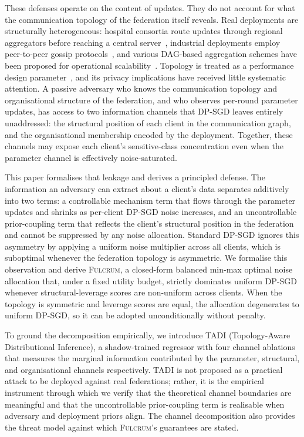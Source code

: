 \documentclass[letterpaper,journal]{IEEEtran}
\newcommand{\TADI}{\textsc{TADI}\xspace}
\newcommand{\Fulcrum}{\textsc{Fulcrum}\xspace}
\begin{document}
These defenses operate on the content of updates. They do not account
for what the communication topology of the federation itself reveals.
Real deployments are structurally heterogeneous: hospital consortia
route updates through regional aggregators before reaching a central
server~\cite{liu2020hierarchical,abad2020icassp}, industrial
deployments employ peer-to-peer gossip
protocols~\cite{roy2019braintorrent,hegedus2021decentralized}, and
various DAG-based aggregation schemes have been proposed for
operational scalability~\cite{beilharz2021dag}. Topology is treated
as a performance design parameter~\cite{wang2021fieldguide}, and its
privacy implications have received little systematic attention. A
passive adversary who knows the communication topology and
organisational structure of the federation, and who observes
per-round parameter updates, has access to two information channels
that DP-SGD leaves entirely unaddressed: the structural position of
each client in the communication graph, and the organisational
membership encoded by the deployment. Together, these channels may
expose each client's sensitive-class concentration even when the
parameter channel is effectively noise-saturated.

This paper formalises that leakage and derives a principled defense.
The information an adversary can extract about a client's data
separates additively into two terms: a controllable mechanism term
that flows through the parameter updates and shrinks as per-client
DP-SGD noise increases, and an uncontrollable prior-coupling term
that reflects the client's structural position in the federation
and cannot be suppressed by any noise allocation. Standard DP-SGD
ignores this asymmetry by applying a uniform noise multiplier across
all clients, which is suboptimal whenever the federation topology is
asymmetric. We formalise this observation and derive \Fulcrum, a
closed-form balanced min-max optimal noise allocation that, under a
fixed utility budget, strictly dominates uniform DP-SGD whenever
structural-leverage scores are non-uniform across clients. When the
topology is symmetric and leverage scores are equal, the allocation
degenerates to uniform DP-SGD, so it can be adopted unconditionally
without penalty.

To ground the decomposition empirically, we introduce \TADI
(Topology-Aware Distributional Inference), a shadow-trained regressor
with four channel ablations that measures the marginal information
contributed by the parameter, structural, and organisational channels
respectively. \TADI is not proposed as a practical attack to be
deployed against real federations; rather, it is the empirical
instrument through which we verify that the theoretical channel
boundaries are meaningful and that the uncontrollable prior-coupling
term is realisable when adversary and deployment priors align. The
channel decomposition also provides the threat model against which
\Fulcrum's guarantees are stated.\medskip
\end{document}
